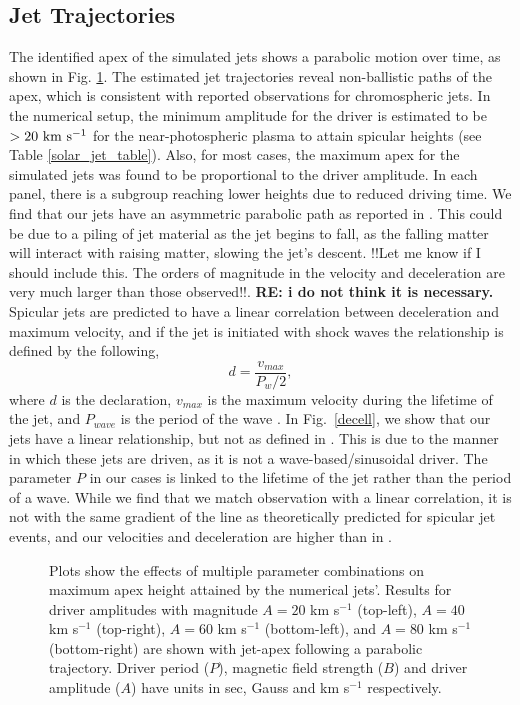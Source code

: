 \subsection{Jet Trajectories}
\label{subsec:jet_traj}
The identified apex of the simulated jets shows a parabolic motion over time, as shown in Fig. \ref{jet_traj}. The estimated jet trajectories reveal non-ballistic paths of the apex, which is consistent with reported observations \citep{Hansteen2006ApJ, Rouppe2007ApJ660L169R, Pontieu2007PASJ} for chromospheric jets. In the numerical setup, the minimum amplitude for the driver is estimated to be $>20 ~\rm{km ~s^{-1}}$ for the near-photospheric plasma to attain spicular heights (see Table \ref{solar_jet_table}). Also, for most cases, the maximum apex for the simulated jets was found to be proportional to the driver amplitude. In each panel, there is a subgroup reaching lower heights due to reduced driving time. We find that our jets have an asymmetric parabolic path as reported in \cite{Singh2019}. This could be due to a piling of jet material as the jet begins to fall, as the falling matter will interact with raising matter, slowing the jet's descent.
%
{\color{green}!!Let me know if I should include this. The orders of magnitude in the velocity and deceleration are very much larger than those observed!!}. {\bf RE: i do not think it is necessary.} Spicular jets are predicted to have a linear correlation between deceleration and maximum velocity, and if the jet is initiated with shock waves the relationship is defined by the following,
\begin{equation} \label{trend_heg}
d = \frac{v_{max}}{P_{w}/2},
\end{equation}
where $d$ is the declaration, $v_{max}$ is the maximum velocity during the lifetime of the jet, and $P_{wave}$ is the period of the wave \citep{Heggland2007ApJ6661277H}. In Fig.~\ref{decell}, we show that our jets have a linear relationship, but not as defined in \cite{Heggland2007ApJ6661277H}. This is due to the manner in which these jets are driven, as it is not a wave-based/sinusoidal driver. The parameter $P$ in our cases is linked to the lifetime of the jet rather than the period of a wave. While we find that we match observation with a linear correlation, it is not with the same gradient of the line as theoretically predicted for spicular jet events, and our velocities and deceleration are higher than in \cite{Heggland2007ApJ6661277H}.   
\begin{figure}
\captionsetup[subfigure]{labelformat=empty}
\centering
{}
\caption{Plots show the effects of multiple parameter combinations on maximum apex height attained by the numerical jets'. Results for driver amplitudes with magnitude $A = 20$ km s$^{-1}$ (top-left), $A = 40$ km s$^{-1}$ (top-right), $A = 60$ km s$^{-1}$ (bottom-left), and $A = 80$ km s$^{-1}$ (bottom-right) are shown with jet-apex following a parabolic trajectory. Driver period ($P$), magnetic field strength ($B$) and driver amplitude ($A$) have units in sec, Gauss and km s$^{-1}$ respectively.}
\label{jet_traj}
\end{figure}
